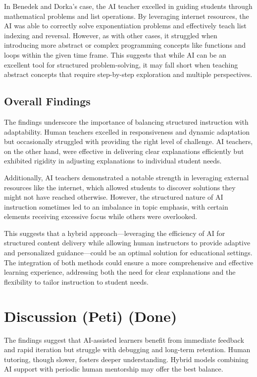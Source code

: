 \documentclass[12pt]{article}  %
\begin{document}
In Benedek and Dorka’s case, the AI teacher excelled in guiding students through mathematical problems and list operations. By leveraging internet resources, the AI was able to correctly solve exponentiation problems and effectively teach list indexing and reversal. However, as with other cases, it struggled when introducing more abstract or complex programming concepts like functions and loops within the given time frame. This suggests that while AI can be an excellent tool for structured problem-solving, it may fall short when teaching abstract concepts that require step-by-step exploration and multiple perspectives.

\subsection{Overall Findings}
The findings underscore the importance of balancing structured instruction with adaptability. Human teachers excelled in responsiveness and dynamic adaptation but occasionally struggled with providing the right level of challenge. AI teachers, on the other hand, were effective in delivering clear explanations efficiently but exhibited rigidity in adjusting explanations to individual student needs.

Additionally, AI teachers demonstrated a notable strength in leveraging external resources like the internet, which allowed students to discover solutions they might not have reached otherwise. However, the structured nature of AI instruction sometimes led to an imbalance in topic emphasis, with certain elements receiving excessive focus while others were overlooked.

This suggests that a hybrid approach—leveraging the efficiency of AI for structured content delivery while allowing human instructors to provide adaptive and personalized guidance—could be an optimal solution for educational settings. The integration of both methods could ensure a more comprehensive and effective learning experience, addressing both the need for clear explanations and the flexibility to tailor instruction to student needs.

\section{Discussion (Peti) (Done)}

The findings suggest that AI-assisted learners benefit from immediate feedback and rapid iteration but struggle with debugging and long-term retention. Human tutoring, though slower, fosters deeper understanding. Hybrid models combining AI support with periodic human mentorship may offer the best balance.
\end{document}
